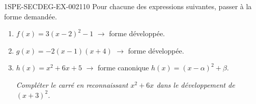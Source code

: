 \begin{exercice}{1SPE-SECDEG-EX-002}{1}{10}
Pour chacune des expressions suivantes, passer à la forme demandée.

\begin{enumerate}
  \item $f(x) = 3(x-2)^2 - 1$ \quad $\longrightarrow$ forme développée.
  \item $g(x) = -2(x-1)(x+4)$ \quad $\longrightarrow$ forme développée.
  \item $h(x) = x^2 + 6x + 5$ \quad $\longrightarrow$ forme canonique $h(x) = (x - \alpha)^2 + \beta$.

  \textit{Compléter le carré en reconnaissant $x^2+6x$ dans le développement de $(x+3)^2$.}
\end{enumerate}
\end{exercice}
